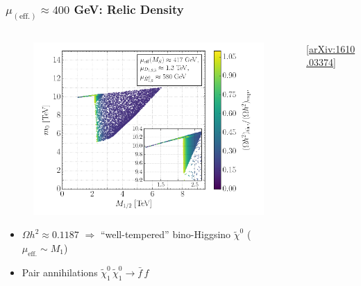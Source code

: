 \documentclass[10pt,aspectratio=169]{beamer}
\begin{document}
\begin{frame}
  \frametitle{$\mu_{(\text{eff.})} \approx 400$ GeV: Relic Density}
  \begin{columns}[t]
    \begin{column}{0.5\textwidth}
      \vspace{-12pt}
      \begin{figure}
        \includegraphics[width=\textwidth]{cse6ssm_mupos400GeV_m12m0_Omega}
      \end{figure}
      \vspace{-12pt}
      \begin{itemize}
        \item $\Omega h^2 \approx 0.1187$ $\Rightarrow$ ``well-tempered''
          bino-Higgsino $\tilde{\chi}^0$ ($\mu_{\text{eff.}} \sim M_1$)
        \item Pair annihilations $\tilde{\chi}_1^0\,\tilde{\chi}_1^0
          \rightarrow \bar{f}\,f$
      \end{itemize}
    \end{column}
    \begin{column}{0.5\textwidth}
      \vspace{-16pt}
      \begin{center}
        \tiny [\href{https://arxiv.org/abs/1610.03374}{arXiv:1610.03374}]
      \end{center}
      \vspace{-20pt}
      \begin{figure}

\end{figure}
\end{column}
\end{columns}
\end{frame}
\end{document}

